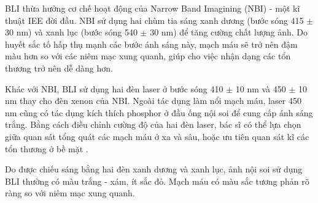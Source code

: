 \documentclass[12pt]{extreport}
\begin{document}
BLI thừa hưởng cơ chế hoạt động của Narrow Band Imagining (NBI) - một kĩ thuật IEE đời đầu. NBI sử dụng hai chùm tia sáng xanh dương (bước sóng 415 $ \pm $ 30 nm) và xanh lục (bước sóng 540 $ \pm $ 30 nm) để tăng cường chất lượng ảnh. Do huyết sắc tố hấp thụ mạnh các bước ánh sáng này, mạch máu sẽ trở nên đậm màu hơn so với các niêm mạc xung quanh, giúp cho việc nhận dạng các tổn thương trở nên dễ dàng hơn.

Khác với NBI, BLI sử dụng hai đèn laser ở bước sóng 410 $ \pm $ 10 nm và 450 $ \pm $ 10 nm thay cho đèn xenon của NBI. Ngoài tác dụng làm nổi mạch máu, laser 450 nm cũng có tác dụng kích thích phosphor ở đầu ống nội soi để cung cấp ánh sáng trắng. Bằng cách điều chỉnh cường độ của hai đèn laser, bác sĩ có thể lựa chọn giữa quan sát tổng quát các mạch máu ở xa và sâu, hoặc ưu tiên quan sát kĩ các tổn thương ở bề mặt \cite{pmid26770267}.

Do được chiếu sáng bằng hai đèn xanh dương và xanh lục, ảnh nội soi sử dụng BLI thường có màu trắng - xám, ít sắc đỏ. Mạch máu có màu sắc tương phản rõ ràng so với niêm mạc xung quanh.
\end{document}
